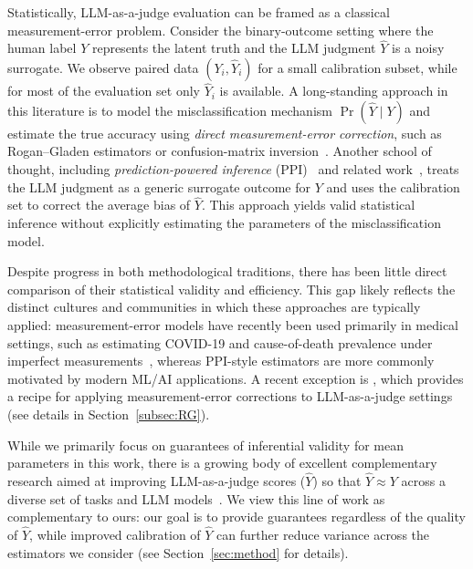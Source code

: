 \documentclass[11pt]{article}
\newcommand{\1}{\mathbf{1}}
\theoremstyle{remark}
\begin{document}
Statistically, LLM-as-a-judge evaluation can be framed as a classical measurement-error problem. Consider the binary-outcome setting where the human label $Y$ represents the latent truth and the LLM judgment $\hat{Y}$ is a noisy surrogate. We observe paired data $(Y_i, \hat{Y}_i)$ for a small calibration subset, while for most of the evaluation set only $\hat{Y}_i$ is available. A long-standing approach in this literature is to model the misclassification mechanism $\Pr(\hat{Y}\mid Y)$ and estimate the true accuracy using \emph{direct measurement-error correction}, such as Rogan--Gladen estimators or confusion-matrix inversion~\citep{rogan1978estimating, fuller2009measurement}.  Another school of thought, including \emph{prediction-powered inference} (PPI)~\citep{angelopoulos2023prediction} and related work~\citep{wang2020methods, miao2025assumption, salerno2025ipd,ji2025predictionssurrogatesrevisitingsurrogate,egami2023using,rister2025correcting}, treats the LLM judgment as a generic surrogate outcome for $Y$ and uses the calibration set to correct the average bias of $\hat{Y}$. This approach yields valid statistical inference without explicitly estimating the parameters of the misclassification model. 

Despite progress in both methodological traditions, there has been little direct comparison of their statistical validity and efficiency. This gap likely reflects the distinct cultures and communities in which these approaches are typically applied: measurement-error models have recently been used primarily in medical settings, such as estimating COVID-19 and cause-of-death prevalence under imperfect measurements~\citep{rosin2023estimating,gonzalez2017review,fiksel2022generalized}, whereas PPI-style estimators are more commonly motivated by modern ML/AI applications. A recent exception is \citet{lee2025correctly}, which provides a recipe for applying measurement-error corrections to LLM-as-a-judge settings (see details in Section~\ref{subsec:RG}).

While we primarily focus on guarantees of inferential validity for mean parameters in this work, there is a growing body of excellent complementary research aimed at improving LLM-as-a-judge scores ($\hat{Y}$) so that $\hat{Y} \approx Y$ across a diverse set of tasks and LLM models~\citep{tian2025overconfidence,liu2024calibrating,shi2024judging,sahoo2025quantitative,schroeder2024can,li2025calibraeval}. We view this line of work as complementary to ours: our goal is to provide guarantees regardless of the quality of $\hat{Y}$, while improved calibration of $\hat{Y}$ can further reduce variance across the estimators we consider (see Section~\ref{sec:method} for details).
\end{document}
